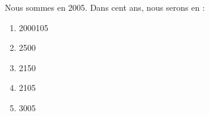 Nous sommes en 2005. Dans cent ans, nous serons en :
\begin{multicols}{5}
  \begin{enumerate}[A/]
    \item 2000105
    \item 2500
    \item 2150
    \item 2105
    \item 3005
  \end{enumerate}
\end{multicols}